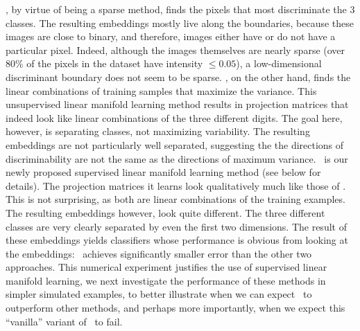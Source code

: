 \documentclass[10pt]{article}
\begin{document}



, by virtue of being a sparse method, finds the pixels that most discriminate the 3 classes.  The resulting embeddings mostly live along the boundaries, because these images are close to binary, and therefore, images either have or do not have a particular pixel. Indeed, although the images themselves are nearly sparse (over 80\% of the pixels in the dataset have intensity $\leq 0.05$),  a low-dimensional discriminant boundary does not seem to be sparse.  \Pca, on the other hand, finds the linear combinations of training samples that maximize the variance.  This unsupervised linear manifold learning method results in projection matrices that indeed look like linear combinations of the three different digits.  The goal here, however, is separating classes, not maximizing variability.  The resulting embeddings are not particularly well separated, suggesting the the directions of discriminability are not the same as the directions of maximum variance.  \Lol~is our newly proposed supervised linear manifold learning method (see below for details).  The projection matrices it learns look qualitatively much like those of \Pca. This is not surprising, as both are linear combinations of the training examples.  The resulting embeddings however, look quite different.  The three different classes are very clearly separated by even the first two dimensions.  The result of these embeddings yields classifiers whose performance is obvious from looking at the embeddings: \Lol~achieves significantly smaller error than the other two approaches.  
This numerical experiment justifies the use of supervised linear manifold learning, we next investigate the performance of these methods in simpler simulated examples, to better illustrate when we can expect \Lol~to outperform other methods, and perhaps more importantly, when we expect this ``vanilla'' variant of \Lol~to fail.
\end{document}
